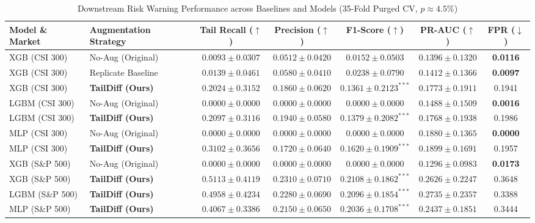 \documentclass[preprint,12pt,authoryear]{elsarticle}
\begin{document}
\begin{table}[htbp]
\centering
\caption{Downstream Risk Warning Performance across Baselines and Models (35-Fold Purged CV, $p \approx 4.5\%$)}
\label{tab:downstream_performance}
\small
\begin{tabular}{llccccc}
\toprule
\textbf{Model \& Market} & \textbf{Augmentation Strategy} & \textbf{Tail Recall ($\uparrow$)} & \textbf{Precision ($\uparrow$)} & \textbf{F1-Score ($\uparrow$)} & \textbf{PR-AUC ($\uparrow$)} & \textbf{FPR ($\downarrow$)} \\ \midrule
XGB (CSI 300) & No-Aug (Original) & $0.0093 \pm 0.0307$ & $0.0512 \pm 0.0420$ & $0.0152 \pm 0.0503$ & $0.1396 \pm 0.1320$ & \textbf{0.0116} \\
XGB (CSI 300) & Replicate Baseline & $0.0139 \pm 0.0461$ & $0.0580 \pm 0.0410$ & $0.0238 \pm 0.0790$ & $0.1412 \pm 0.1366$ & \textbf{0.0097} \\
XGB (CSI 300) & \textbf{TailDiff (Ours)} & $\mathbf{0.2024 \pm 0.3152}$ & $\mathbf{0.1860 \pm 0.0620}$ & $\mathbf{0.1361 \pm 0.2123}^{***}$ & $\mathbf{0.1773 \pm 0.1911}$ & 0.1941 \\ \midrule
LGBM (CSI 300) & No-Aug (Original) & $0.0000 \pm 0.0000$ & $0.0000 \pm 0.0000$ & $0.0000 \pm 0.0000$ & $0.1488 \pm 0.1509$ & \textbf{0.0016} \\
LGBM (CSI 300) & \textbf{TailDiff (Ours)} & $\mathbf{0.2097 \pm 0.3116}$ & $\mathbf{0.1940 \pm 0.0580}$ & $\mathbf{0.1379 \pm 0.2082}^{***}$ & $\mathbf{0.1768 \pm 0.1938}$ & 0.1986 \\ \midrule
MLP (CSI 300) & No-Aug (Original) & $0.0000 \pm 0.0000$ & $0.0000 \pm 0.0000$ & $0.0000 \pm 0.0000$ & $0.1880 \pm 0.1365$ & \textbf{0.0000} \\
MLP (CSI 300) & \textbf{TailDiff (Ours)} & $\mathbf{0.3102 \pm 0.3656}$ & $\mathbf{0.1720 \pm 0.0640}$ & $\mathbf{0.1620 \pm 0.1909}^{***}$ & $\mathbf{0.1899 \pm 0.1691}$ & 0.1957 \\ \midrule
XGB (S\&P 500) & No-Aug (Original) & $0.0000 \pm 0.0000$ & $0.0000 \pm 0.0000$ & $0.0000 \pm 0.0000$ & $0.1296 \pm 0.0983$ & \textbf{0.0173} \\
XGB (S\&P 500) & \textbf{TailDiff (Ours)} & $\mathbf{0.5113 \pm 0.4119}$ & $\mathbf{0.2310 \pm 0.0710}$ & $\mathbf{0.2108 \pm 0.1862}^{***}$ & $\mathbf{0.2626 \pm 0.2247}$ & 0.3648 \\
LGBM (S\&P 500) & \textbf{TailDiff (Ours)} & $\mathbf{0.4958 \pm 0.4234}$ & $\mathbf{0.2280 \pm 0.0690}$ & $\mathbf{0.2096 \pm 0.1854}^{***}$ & $\mathbf{0.2735 \pm 0.2357}$ & 0.3388 \\
MLP (S\&P 500) & \textbf{TailDiff (Ours)} & $\mathbf{0.4067 \pm 0.3386}$ & $\mathbf{0.2150 \pm 0.0650}$ & $\mathbf{0.2036 \pm 0.1708}^{***}$ & $\mathbf{0.2437 \pm 0.1851}$ & 0.3444 \\ \bottomrule
\end{tabular}
\end{table}
\end{document}
